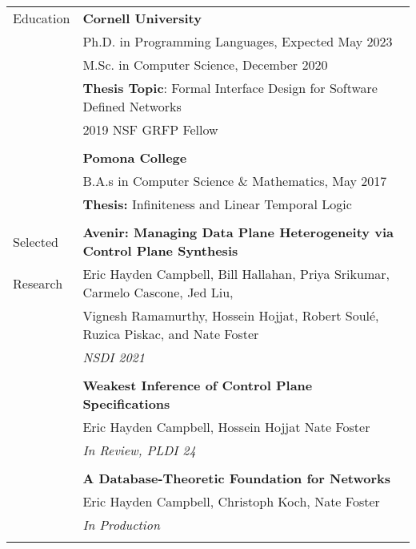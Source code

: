 \documentclass[letterpaper,10pt,oneside]{article}
\begin{document}
\noindent
\begin{tabular}{@{} l l}
  \Large{Education} 
  & \textbf{Cornell University} \\
  & Ph.D. in Programming Languages, Expected May 2023 \\
  & M.Sc. in Computer Science, December 2020 \\
  & \textbf{Thesis Topic}: Formal Interface Design for Software Defined Networks \\
  & 2019 NSF GRFP Fellow \\
  \\


  & \textbf{Pomona College} \\
  & B.A.s in Computer Science \& Mathematics, May 2017 \\
  & \textbf{Thesis:} Infiniteness and Linear Temporal Logic \\
  & \\



  \Large{Selected}
  & \textbf{Avenir: Managing Data Plane Heterogeneity via Control Plane Synthesis}\\
  \Large{Research}
  & Eric Hayden Campbell, Bill Hallahan, Priya Srikumar, Carmelo Cascone, Jed Liu, \\ & Vignesh Ramamurthy, Hossein Hojjat, Robert  Soul\'{e}, Ruzica Piskac,  and  Nate Foster\\
  & \textit{NSDI 2021} \\
  &\\

  & \textbf{Weakest Inference of Control Plane Specifications} \\
  & Eric Hayden Campbell, Hossein Hojjat Nate Foster \\
  & \textit{In Review, PLDI 24} \\
  & \\

  & \textbf{A Database-Theoretic Foundation for Networks} \\
  & Eric Hayden Campbell, Christoph Koch, Nate Foster \\
  & \textit{In Production} \\
  & \\



\end{tabular}
\end{document}
